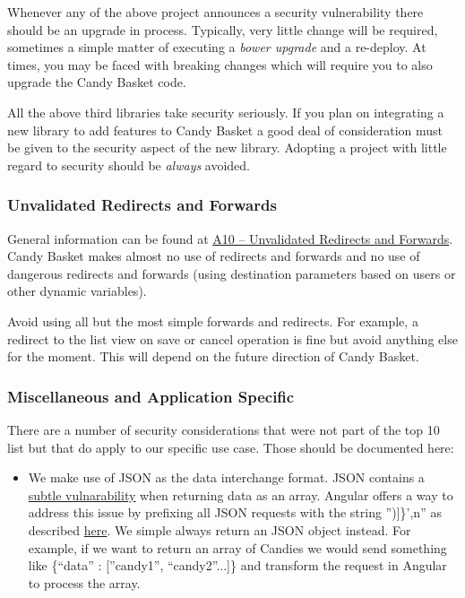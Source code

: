 \documentclass[letterpaper,10pt,english]{sphinxmanual}
\begin{document}
Whenever any of the above project announces a security vulnerability
there should be an upgrade in process. Typically, very little change
will be required, sometimes a simple matter of executing a \emph{bower
upgrade} and a re-deploy. At times, you may be faced with breaking
changes which will require you to also upgrade the Candy Basket code.

All the above third libraries take security seriously. If you plan on
integrating a new library to add features to Candy Basket a good deal
of consideration must be given to the security aspect of the new
library. Adopting a project with little regard to security should be
\emph{always} avoided.


\subsubsection{Unvalidated Redirects and Forwards}
\label{developer-guide:unvalidated-redirects-and-forwards}
General information can be found at \href{https://owasp.org/index.php/Top\_10\_2013-A10-Unvalidated\_Redirects\_and\_Forwards}{A10 -- Unvalidated Redirects and
Forwards}. Candy
Basket makes almost no use of redirects and forwards and no use of
dangerous redirects and forwards (using destination parameters based
on users or other dynamic variables).

Avoid using all but the most simple forwards and redirects. For
example, a redirect to the list view on save or cancel operation is
fine but avoid anything else for the moment. This will depend on the
future direction of Candy Basket.


\subsubsection{Miscellaneous and Application Specific}
\label{developer-guide:miscellaneous-and-application-specific}
There are a number of security considerations that were not part of
the top 10 list but that do apply to our specific use case. Those
should be documented here:
\begin{itemize}
\item {} 
We make use of JSON as the data interchange format. JSON contains a
\href{http://haacked.com/archive/2008/11/20/anatomy-of-a-subtle-json-vulnerability.aspx}{subtle vulnarability}
when returning data as an array. Angular offers a way to address
this issue by prefixing all JSON requests with the string ''){]}\}',n''
as described \href{http://docs.angularjs.org/api/ng/service/\$http}{here}. We simple always
return an JSON object instead. For example, if we want to return an
array of Candies we would send something like \{``data'' : {[}''candy1'',
``candy2''...{]}\} and transform the request in Angular to process the
array.

\end{itemize}
\end{document}
